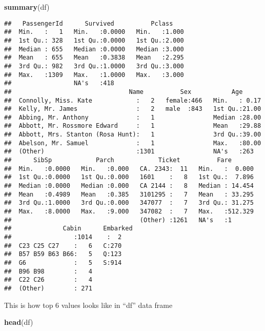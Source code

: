 \documentclass[]{article}
\newenvironment{Shaded}{\begin{snugshade}}{\end{snugshade}}
\newcommand{\KeywordTok}[1]{\textcolor[rgb]{0.13,0.29,0.53}{\textbf{#1}}}
\newcommand{\NormalTok}[1]{#1}
\begin{document}
\begin{Shaded}
\begin{Highlighting}[]
\KeywordTok{summary}\NormalTok{(df)}
\end{Highlighting}
\end{Shaded}

\begin{verbatim}
##   PassengerId      Survived          Pclass     
##  Min.   :   1   Min.   :0.0000   Min.   :1.000  
##  1st Qu.: 328   1st Qu.:0.0000   1st Qu.:2.000  
##  Median : 655   Median :0.0000   Median :3.000  
##  Mean   : 655   Mean   :0.3838   Mean   :2.295  
##  3rd Qu.: 982   3rd Qu.:1.0000   3rd Qu.:3.000  
##  Max.   :1309   Max.   :1.0000   Max.   :3.000  
##                 NA's   :418                     
##                                Name          Sex           Age       
##  Connolly, Miss. Kate            :   2   female:466   Min.   : 0.17  
##  Kelly, Mr. James                :   2   male  :843   1st Qu.:21.00  
##  Abbing, Mr. Anthony             :   1                Median :28.00  
##  Abbott, Mr. Rossmore Edward     :   1                Mean   :29.88  
##  Abbott, Mrs. Stanton (Rosa Hunt):   1                3rd Qu.:39.00  
##  Abelson, Mr. Samuel             :   1                Max.   :80.00  
##  (Other)                         :1301                NA's   :263    
##      SibSp            Parch            Ticket          Fare        
##  Min.   :0.0000   Min.   :0.000   CA. 2343:  11   Min.   :  0.000  
##  1st Qu.:0.0000   1st Qu.:0.000   1601    :   8   1st Qu.:  7.896  
##  Median :0.0000   Median :0.000   CA 2144 :   8   Median : 14.454  
##  Mean   :0.4989   Mean   :0.385   3101295 :   7   Mean   : 33.295  
##  3rd Qu.:1.0000   3rd Qu.:0.000   347077  :   7   3rd Qu.: 31.275  
##  Max.   :8.0000   Max.   :9.000   347082  :   7   Max.   :512.329  
##                                   (Other) :1261   NA's   :1        
##              Cabin      Embarked
##                 :1014    :  2   
##  C23 C25 C27    :   6   C:270   
##  B57 B59 B63 B66:   5   Q:123   
##  G6             :   5   S:914   
##  B96 B98        :   4           
##  C22 C26        :   4           
##  (Other)        : 271
\end{verbatim}

This is how top 6 values looks like in ``df'' data frame

\begin{Shaded}
\begin{Highlighting}[]
\KeywordTok{head}\NormalTok{(df)}
\end{Highlighting}
\end{Shaded}
\end{document}
